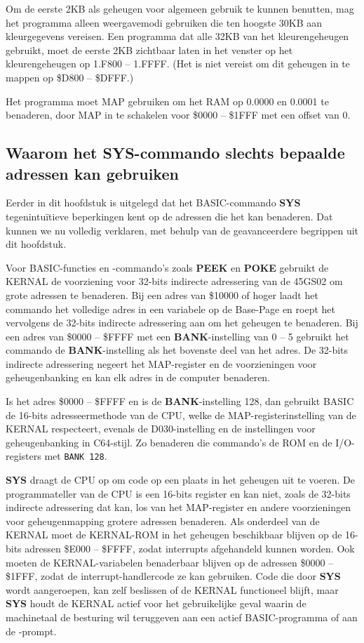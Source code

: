 Om de eerste 2KB als geheugen voor algemeen gebruik te kunnen benutten, mag het programma alleen weergavemodi gebruiken die ten hoogste 30KB aan kleurgegevens vereisen. Een programma dat alle 32KB van het kleurengeheugen gebruikt, moet de eerste 2KB zichtbaar laten in het venster op het kleurengeheugen op 1.F800 -- 1.FFFF. (Het is niet vereist om dit geheugen in te mappen op \$D800 -- \$DFFF.)

Het programma moet MAP gebruiken om het RAM op 0.0000 en 0.0001 te benaderen, door MAP in te schakelen voor \$0000 -- \$1FFF met een offset van 0.

\subsection{Waarom het SYS-commando slechts bepaalde adressen kan gebruiken}

Eerder in dit hoofdstuk is uitgelegd dat het BASIC-commando {\bf SYS} tegenintuïtieve beperkingen kent op de adressen die het kan benaderen. Dat kunnen we nu volledig verklaren, met behulp van de geavanceerdere begrippen uit dit hoofdstuk.

Voor BASIC-functies en -commando's zoals {\bf PEEK} en {\bf POKE} gebruikt de KERNAL de voorziening voor 32-bits indirecte adressering van de 45GS02 om grote adressen te benaderen. Bij een adres van \$10000 of hoger laadt het commando het volledige adres in een variabele op de Base-Page en roept het vervolgens de 32-bits indirecte adressering aan om het geheugen te benaderen. Bij een adres van \$0000 -- \$FFFF met een {\bf BANK}-instelling van 0 -- 5 gebruikt het commando de {\bf BANK}-instelling als het bovenste deel van het adres. De 32-bits indirecte adressering negeert het MAP-register en de voorzieningen voor geheugenbanking en kan elk adres in de computer benaderen.

Is het adres \$0000 -- \$FFFF en is de {\bf BANK}-instelling 128, dan gebruikt BASIC de 16-bits adresseermethode van de CPU, welke de MAP-registerinstelling van de KERNAL respecteert, evenals de D030-instelling en de instellingen voor geheugenbanking in C64-stijl. Zo benaderen die commando's de ROM en de I/O-registers met \texttt{BANK 128}.

{\bf SYS} draagt de CPU op om code op een plaats in het geheugen uit te voeren. De programmateller van de CPU is een 16-bits register en kan niet, zoals de 32-bits indirecte adressering dat kan, los van het MAP-register en andere voorzieningen voor geheugenmapping grotere adressen benaderen. Als onderdeel van de KERNAL moet de KERNAL-ROM in het geheugen beschikbaar blijven op de 16-bits adressen \$E000 -- \$FFFF, zodat interrupts afgehandeld kunnen worden. Ook moeten de KERNAL-variabelen benaderbaar blijven op de adressen \$0000 -- \$1FFF, zodat de interrupt-handlercode ze kan gebruiken. Code die door {\bf SYS} wordt aangeroepen, kan zelf beslissen of de KERNAL functioneel blijft, maar {\bf SYS} houdt de KERNAL actief voor het gebruikelijke geval waarin de machinetaal de besturing wil teruggeven aan een actief BASIC-programma of aan de -prompt.

